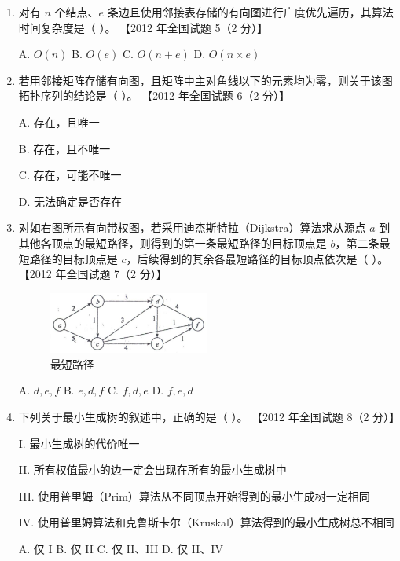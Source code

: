 \documentclass[lang=cn,newtx,10pt,scheme=chinese]{elegantbook}
\begin{document}
\begin{enumerate}
        \item 对有 $n$ 个结点、$e$ 条边且使用邻接表存储的有向图进行广度优先遍历，其算法时间复杂度是（ ）。  
        【2012 年全国试题 5（2 分）】  

        A. $O(n)$ \quad B. $O(e)$ \quad C. $O(n + e)$ \quad D. $O(n \times e)$  
    
        \item 若用邻接矩阵存储有向图，且矩阵中主对角线以下的元素均为零，则关于该图拓扑序列的结论是（ ）。  
        【2012 年全国试题 6（2 分）】  

        A. 存在，且唯一  

        B. 存在，且不唯一  

        C. 存在，可能不唯一  

        D. 无法确定是否存在  
    
        \item 对如右图所示有向带权图，若采用迪杰斯特拉（Dijkstra）算法求从源点 $a$ 到其他各顶点的最短路径，则得到的第一条最短路径的目标顶点是 $b$，第二条最短路径的目标顶点是 $c$，后续得到的其余各最短路径的目标顶点依次是（ ）。  
        【2012 年全国试题 7（2 分）】  

        \begin{figure}[h!]
            \centering
            \includegraphics[width=0.5\textwidth]{./figure/exercisePicPDF/chapter7/7-14.pdf}
            \caption{最短路径}
    \end{figure}
        A. $d,e,f$ \quad B. $e, d, f$ \quad C. $f,d, e$ \quad D. $f,e,d$  
    
        \item 下列关于最小生成树的叙述中，正确的是（ ）。  
        【2012 年全国试题 8（2 分）】  

        I. 最小生成树的代价唯一  

        II. 所有权值最小的边一定会出现在所有的最小生成树中 

        III. 使用普里姆（Prim）算法从不同顶点开始得到的最小生成树一定相同  

        IV. 使用普里姆算法和克鲁斯卡尔（Kruskal）算法得到的最小生成树总不相同  

        A. 仅 I \quad B. 仅 II \quad C. 仅 II、III \quad D. 仅 II、IV  
    

\end{enumerate}
\end{document}
